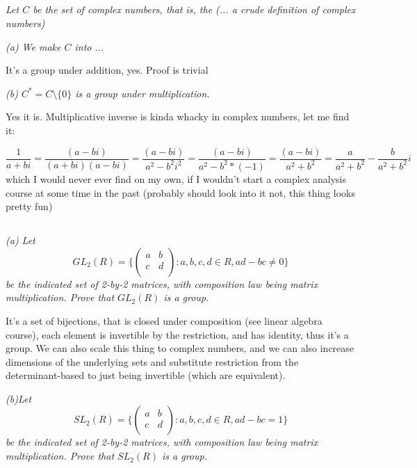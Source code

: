 \documentclass[11pt,oneside,titlepage]{book}
\newcommand{\set}[1]{\{ #1 \}}
\begin{document}
\subsection{}

\textit{Let $C$ be the set of complex numbers, that is, the (... a
crude definition of complex numbers)}

\textit{(a) We make $C$ into ...}

It's a group under addition, yes. Proof is trivial

\textit{(b) $C^* = C \setminus \set{0}$ is a group under
multiplication.}

Yes it is. Multiplicative inverse is kinda whacky in complex numbers,
let me find it:

$$\frac{1}{a + bi} = \frac{(a - bi)}{(a + bi)(a - bi)} =
\frac{(a - bi)}{a^2 - b^2i^2} = \frac{(a - bi)}{a^2 - b^2 * (-1)} =
\frac{(a - bi)}{a^2 + b^2} = \frac{a}{a^2 + b^2} - \frac{b}{a^2 +
b^2}i$$ which I would never ever find on my own, if I wouldn't start a
complex analysis course at some time in the past (probably should look
into it not, this thing looks pretty fun)

\subsection{}

\textit{(a) Let
$$GL_2(R) = \set{
  \begin{pmatrix} a & b \\ c & d \\
  \end{pmatrix}: a, b, c, d \in R, ad - bc \neq 0}
  $$
  be the indicated set of 2-by-2 matrices, with composition law being
matrix multiplication.  Prove that $GL_2(R)$ is a group.  }

It's a set of bijections, that is closed under composition (see linear
algebra course), each element is invertible by the restriction, and
has identity, thus it's a group.  We can also scale this thing to
complex numbers, and we can also increase dimensions of the underlying
sets and substitute restriction from the determinant-based to just
being invertible (which are equivalent).

\textit{(b)Let
$$SL_2(R) = \set{
  \begin{pmatrix} a & b \\ c & d \\
  \end{pmatrix}: a, b, c, d \in R, ad - bc = 1}
  $$
  be the indicated set of 2-by-2 matrices, with composition law being
matrix multiplication.  Prove that $SL_2(R)$ is a group.  }
\end{document}
